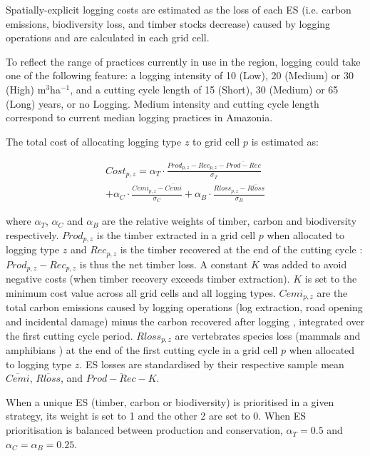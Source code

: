 \documentclass{article}
\begin{document}
Spatially-explicit logging costs are estimated as the loss of each ES (i.e. carbon emissions, biodiversity loss, and timber stocks decrease) caused by logging operations and are calculated in each grid cell.

To reflect the range of practices currently in use in the region, logging could take one of the following feature: a logging intensity of 10 (Low), 20 (Medium) or 30 (High) m$^3$ha$^{−1}$, and a cutting cycle length of 15 (Short), 30 (Medium) or 65 (Long) years, or no Logging. Medium intensity and cutting cycle length correspond to current median logging practices in Amazonia. 

The total cost of allocating logging type $z$ to grid cell $p$ is estimated as: 

\begin{equation}
\begin{split}
    Cost_{p,z} = \alpha _T \cdot \frac{Prod_{p,z} - Rec_{p,z} - \overline{Prod - Rec}}{\sigma_T} \\+ \alpha _C \cdot \frac{Cemi_{p,z} - \overline{Cemi}}{ \sigma_C}  + \alpha _B \cdot \frac{Rloss_{p,z} - \overline{Rloss}}{\sigma_R} 
\end{split}
\end{equation}

where $\alpha_T$, $\alpha_C$ and $\alpha_B$ are the relative weights of timber, carbon and biodiversity respectively. 
$Prod_{p,z}$ is the timber extracted in a grid cell $p$ when allocated to logging type $z$ and $Rec_{p,z}$ is the timber recovered at the end of the cutting cycle \cite{Piponiotc}: $Prod_{p,z} - Rec_{p,z}$ is thus the net timber loss. A constant $K$ was added to avoid negative costs (when timber recovery exceeds timber extraction). $K$ is set to the minimum cost value across all grid cells and all logging types. 
$Cemi_{p,z}$ are the total carbon emissions caused by logging operations (log extraction, road opening and incidental damage) minus the carbon recovered after logging \cite{Piponiot2016a}, integrated over the first cutting cycle period.
$Rloss_{p,z}$ are vertebrates species loss (mammals and amphibians \cite{Jenkins2013}) at the end of the first cutting cycle in a grid cell $p$ when allocated to logging type $z$. 
ES losses are standardised by their respective sample mean $\overline{Cemi}$, $\overline{Rloss}$, and $\overline{Prod-Rec-K}$. 

When a unique ES (timber, carbon or biodiversity) is prioritised in a given strategy, its weight is set to 1 and the other 2 are set to 0. When ES prioritisation is balanced between production and conservation, $\alpha_T = 0.5$ and $\alpha_C = \alpha_B = 0.25$.
\end{document}

